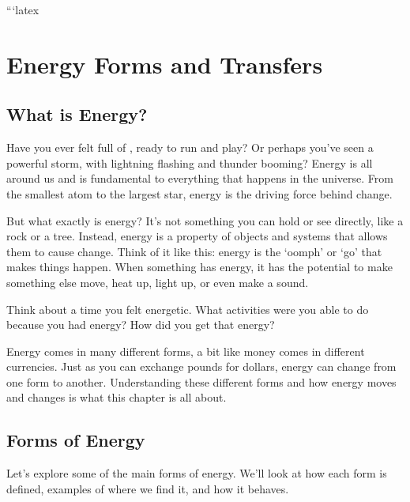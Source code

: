 ```latex
\chapter{Energy Forms and Transfers}

\section{What is Energy?}

Have you ever felt full of , ready to run and play? Or perhaps you’ve seen a powerful storm, with lightning flashing and thunder booming? Energy is all around us and is fundamental to everything that happens in the universe.  From the smallest atom to the largest star, energy is the driving force behind change.


But what exactly is energy?  It's not something you can hold or see directly, like a rock or a tree. Instead, energy is a property of objects and systems that allows them to cause change.  Think of it like this: energy is the ‘oomph’ or ‘go’ that makes things happen.  When something has energy, it has the potential to make something else move, heat up, light up, or even make a sound.

\begin{stopandthink}
Think about a time you felt energetic. What activities were you able to do because you had energy? How did you get that energy?
\end{stopandthink}

Energy comes in many different forms, a bit like money comes in different currencies.  Just as you can exchange pounds for dollars, energy can change from one form to another.  Understanding these different forms and how energy moves and changes is what this chapter is all about.

\section{Forms of Energy}

Let's explore some of the main forms of energy. We'll look at how each form is defined, examples of where we find it, and how it behaves.

